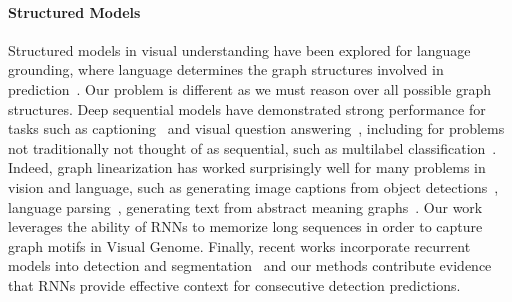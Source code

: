 \documentclass[10pt,twocolumn,letterpaper]{article}
\begin{document}
\paragraph{Structured Models}
Structured models in visual understanding have been explored for language grounding, where language determines the graph structures involved in prediction~\cite{plummer2015flickr30k,fidler_grounding_graph, tellex2011approaching, hu2017learning}.
Our problem is different as we must reason over all possible graph structures. 
Deep sequential models have demonstrated strong performance for tasks such as captioning~\cite{larrycaption,msrcaption, googlecaption, stanfordcaption} and visual question answering~\cite{vqa1,vqa2,vqa3,vqa4,vqa5}, including for problems not traditionally not thought of as sequential, such as multilabel classification~\cite{cnnrnn16}. Indeed, graph linearization has worked surprisingly well for many problems in vision and language, such as generating image captions from object detections~\cite{obj2textEMNLP2017}, language parsing~\cite{vinyals2015grammar}, generating text from abstract meaning graphs~\cite{konstas2017neural}. Our work leverages the ability of RNNs to memorize long sequences in order to capture graph motifs in Visual Genome. Finally, recent works incorporate recurrent models into detection and segmentation~\cite{polygonrnn,ren2016end} and our methods contribute evidence that RNNs provide effective context for consecutive detection predictions.
\end{document}
